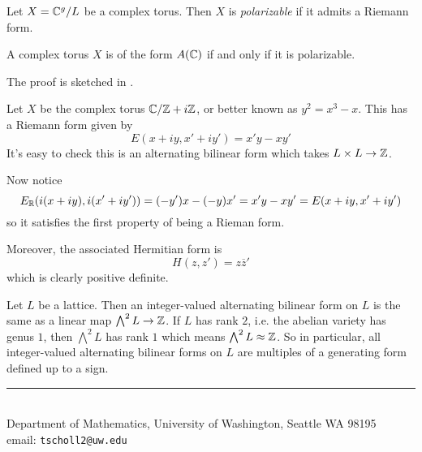 \documentclass[11pt]{article}
\makeatletter
\newcommand{\myauthor}{Travis Scholl}
\newcommand{\myemail}{tscholl2@uw.edu}
\makeatother
\begin{document}
\begin{defn}
	Let $X = \mathbb{C}^g/L$ be a complex torus. Then $X$ is \emph{polarizable} if it admits a Riemann form.
\end{defn}

\begin{thm}\label{thm:polarizable}
	A complex torus $X$ is of the form $A(\mathbb{C})$ if and only if it is polarizable.
\end{thm}

The proof is sketched in \cite[Thm.~2.8]{milneAV}.

\begin{ex}
	Let $X$ be the complex torus $\mathbb{C}/\mathbb{Z}+ i\mathbb{Z}$, or better known as $y^2 = x^3 - x$. This has a Riemann form given by
	$$
	E(x+iy,x'+iy') = x'y - xy'
	$$
	It's easy to check this is an alternating bilinear form which takes $L\times L \to \mathbb{Z}$. 
	
	Now notice
	$$
	E_{\mathbb{R}}(i(x+iy),i(x'+iy')) = (-y')x - (-y)x' = x'y - xy' = E(x+iy,x'+iy')
	$$
	so it satisfies the first property of being a Rieman form.
	
	Moreover, the associated Hermitian form is
	$$
	H(z,z') = z\overline{z}'
	$$
	which is clearly positive definite.
\end{ex}

\begin{rem}
	Let $L$ be a lattice. Then an integer-valued alternating bilinear form on $L$ is the same as a linear map $\bigwedge^2 L\to \mathbb{Z}$. If $L$ has rank $2$, i.e. the abelian variety has genus $1$, then $\bigwedge^2 L$ has rank $1$ which means $\bigwedge^2 L \approx \mathbb{Z}$. So in particular, all integer-valued alternating bilinear forms on $L$ are multiples of a generating form defined up to a sign.
\end{rem}






\begin{center}
\noindent\rule{4cm}{.5pt}
\vspace{.25cm}

\noindent {\sc \small \myauthor}\\
{\small Department of Mathematics, University of Washington, Seattle WA 98195} \\
email: {\tt \myemail}
\end{center}
\end{document}
